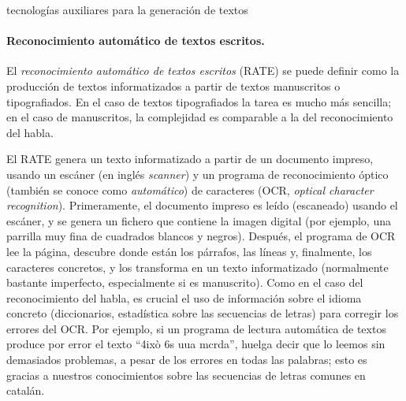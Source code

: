 \begin{persabermes}{tecnologías auxiliares para la generación de textos}
\paragraph{Reconocimiento automático de textos escritos.} El \emph{reconocimiento automático de textos escritos} (RATE) se puede definir como la producción de textos informatizados a partir de textos manuscritos o tipografiados. En el caso de textos tipografiados la tarea es mucho más sencilla; en el caso de manuscritos, la complejidad es comparable a la del reconocimiento del habla. 

El RATE genera un texto informatizado a partir de un documento impreso, usando un escáner (en inglés \emph{scanner}) y un programa de reconocimiento óptico (también se conoce como {\em automático}) de caracteres (OCR, \emph{optical character recognition}). Primeramente, el documento impreso es leído (escaneado) usando el escáner, y se  genera un fichero que  contiene la imagen digital (por ejemplo, una parrilla muy fina de cuadrados blancos y negros). Después, el programa de OCR lee la página, descubre donde están los párrafos, las líneas y, finalmente, los caracteres concretos, y los transforma en un texto informatizado (normalmente bastante imperfecto, especialmente si es manuscrito). Como en el caso del reconocimiento del habla, es crucial el uso de información sobre el idioma concreto (diccionarios, estadística sobre las secuencias de letras) para corregir los errores del OCR. Por ejemplo, si un programa de lectura automática de textos produce por error el texto ``4ixò 6s uua mcrda'', huelga decir que lo leemos sin demasiados problemas, a pesar de los errores en todas las palabras; esto es gracias a nuestros conocimientos sobre las secuencias de letras comunes en catalán. 

\mbox{} \end{persabermes} 

